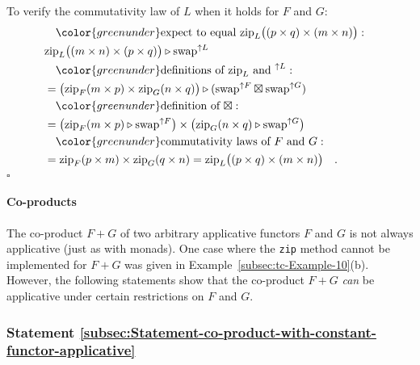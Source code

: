 To verify the commutativity law of $L$ when it holds for $F$ and
$G$:
\begin{align*}
 & \quad{\color{greenunder}\text{expect to equal }\text{zip}_{L}\big((p\times q)\times(m\times n)\big):}\quad\\
 & \text{zip}_{L}\big((m\times n)\times(p\times q)\big)\triangleright\text{swap}^{\uparrow L}\\
 & \quad{\color{greenunder}\text{definitions of }\text{zip}_{L}\text{ and }^{\uparrow L}:}\quad\\
 & =\big(\text{zip}_{F}(m\times p)\times\text{zip}_{G}(n\times q)\big)\triangleright(\text{swap}^{\uparrow F}\boxtimes\text{swap}^{\uparrow G})\\
 & \quad{\color{greenunder}\text{definition of }\boxtimes:}\quad\\
 & =\big(\text{zip}_{F}(m\times p)\triangleright\text{swap}^{\uparrow F}\big)\times\big(\text{zip}_{G}(n\times q)\triangleright\text{swap}^{\uparrow G}\big)\\
 & \quad{\color{greenunder}\text{commutativity laws of }F\text{ and }G:}\quad\\
 & =\text{zip}_{F}(p\times m)\times\text{zip}_{G}(q\times n)=\text{zip}_{L}\big((p\times q)\times(m\times n)\big)\quad.
\end{align*}
$\square$

\paragraph{Co-products}

The co-product $F+G$ of two arbitrary applicative functors $F$ and
$G$ is not always applicative (just as with monads). One case where
the \lstinline!zip! method cannot be implemented for $F+G$ was given
in Example~\ref{subsec:tc-Example-10}(b). However, the following
statements show that the co-product $F+G$ \emph{can} be applicative
under certain restrictions on $F$ and $G$.

\subsubsection{Statement \label{subsec:Statement-co-product-with-constant-functor-applicative}\ref{subsec:Statement-co-product-with-constant-functor-applicative}}

